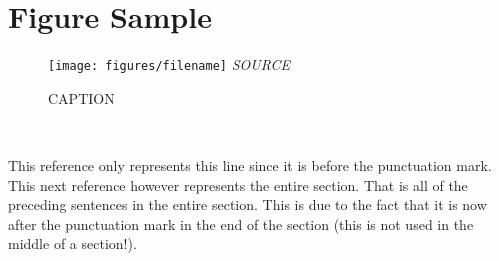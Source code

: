 \section{Figure Sample}

\begin{figure}[H]
	\caption{CAPTION}
	\label{LABEL}
	\centering
	\texttt{[image: figures/filename]}
	\flushleft
	\textit{SOURCE}
\end{figure}


\noindent
{}\\

\noindent
{}

\vspace{.5cm}

This reference only represents this line since it is before the punctuation mark\cite{YDing}. This next reference however represents the entire section. That is all of the preceding sentences in the entire section. This is due to the fact that it is now after the punctuation mark in the end of the section (this is not used in the middle of a section!).\cite{YDing}
\pagebreak